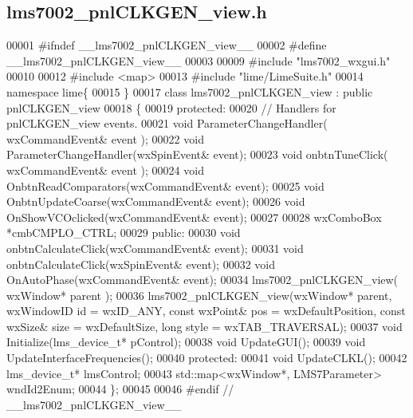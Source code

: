 \subsection{lms7002\+\_\+pnl\+C\+L\+K\+G\+E\+N\+\_\+view.\+h}
\label{lms7002__pnlCLKGEN__view_8h_source}

\begin{DoxyCode}
00001 \textcolor{preprocessor}{#ifndef \_\_lms7002\_pnlCLKGEN\_view\_\_}
00002 \textcolor{preprocessor}{#define \_\_lms7002\_pnlCLKGEN\_view\_\_}
00003 
00009 \textcolor{preprocessor}{#include "lms7002_wxgui.h"}
00010 
00012 \textcolor{preprocessor}{#include <map>}
00013 \textcolor{preprocessor}{#include "lime/LimeSuite.h"}
00014 \textcolor{keyword}{namespace }lime\{
00015 \}
00017 \textcolor{keyword}{class }lms7002_pnlCLKGEN_view : \textcolor{keyword}{public} pnlCLKGEN_view
00018 \{
00019     \textcolor{keyword}{protected}:
00020         \textcolor{comment}{// Handlers for pnlCLKGEN\_view events.}
00021         \textcolor{keywordtype}{void} ParameterChangeHandler( wxCommandEvent& event );
00022         \textcolor{keywordtype}{void} ParameterChangeHandler(wxSpinEvent& event);
00023         \textcolor{keywordtype}{void} onbtnTuneClick( wxCommandEvent& event );
00024         \textcolor{keywordtype}{void} OnbtnReadComparators(wxCommandEvent& event);
00025         \textcolor{keywordtype}{void} OnbtnUpdateCoarse(wxCommandEvent& event);
00026         \textcolor{keywordtype}{void} OnShowVCOclicked(wxCommandEvent& event);
00027 
00028         wxComboBox *cmbCMPLO_CTRL;
00029     \textcolor{keyword}{public}:
00030         \textcolor{keywordtype}{void} onbtnCalculateClick(wxCommandEvent& event);
00031         \textcolor{keywordtype}{void} onbtnCalculateClick(wxSpinEvent& event);
00032         \textcolor{keywordtype}{void} OnAutoPhase(wxCommandEvent& event);
00034         lms7002_pnlCLKGEN_view( wxWindow* parent );
00036     lms7002_pnlCLKGEN_view(wxWindow* parent, wxWindowID \textcolor{keywordtype}{id} = wxID\_ANY, \textcolor{keyword}{const} wxPoint& pos = 
      wxDefaultPosition, \textcolor{keyword}{const} wxSize& size = wxDefaultSize, \textcolor{keywordtype}{long} style = wxTAB\_TRAVERSAL);
00037     \textcolor{keywordtype}{void} Initialize(lms_device_t* pControl);
00038     \textcolor{keywordtype}{void} UpdateGUI();
00039     \textcolor{keywordtype}{void} UpdateInterfaceFrequencies();
00040 \textcolor{keyword}{protected}:
00041     \textcolor{keywordtype}{void} UpdateCLKL();
00042     lms_device_t* lmsControl;
00043     std::map<wxWindow*, LMS7Parameter> wndId2Enum;
00044 \};
00045 
00046 \textcolor{preprocessor}{#endif // \_\_lms7002\_pnlCLKGEN\_view\_\_}
\end{DoxyCode}
